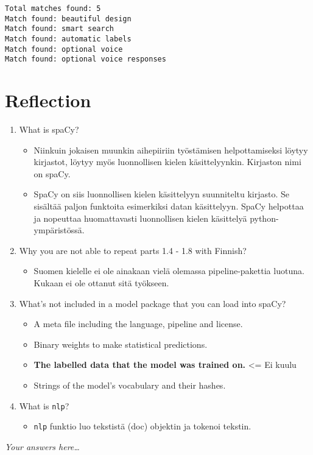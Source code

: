 \documentclass[11pt]{article}
\providecommand{\tightlist}{%
      \setlength{\itemsep}{0pt}\setlength{\parskip}{0pt}}
\begin{document}
    \begin{Verbatim}[commandchars=\\\{\}]
Total matches found: 5
Match found: beautiful design
Match found: smart search
Match found: automatic labels
Match found: optional voice
Match found: optional voice responses

    \end{Verbatim}

    \hypertarget{reflection}{%
\section{Reflection}\label{reflection}}

\begin{enumerate}
\def\labelenumi{\arabic{enumi}.}
\tightlist
\item
  What is spaCy?

  \begin{itemize}
  \tightlist
  \item
    Niinkuin jokaisen muunkin aihepiiriin työstämisen helpottamiseksi
    löytyy kirjastot, löytyy myös luonnollisen kielen käsittelyynkin.
    Kirjaston nimi on spaCy.
  \item
    SpaCy on siis luonnollisen kielen käsittelyyn suunniteltu kirjasto.
    Se sisältää paljon funktoita esimerkiksi datan käsittelyyn. SpaCy
    helpottaa ja nopeuttaa huomattavasti luonnollisen kielen käsittelyä
    python-ympäristössä.
  \end{itemize}
\item
  Why you are not able to repeat parts 1.4 - 1.8 with Finnish?

  \begin{itemize}
  \tightlist
  \item
    Suomen kielelle ei ole ainakaan vielä olemassa pipeline-pakettia
    luotuna. Kukaan ei ole ottanut sitä työkseen.
  \end{itemize}
\item
  What's not included in a model package that you can load into spaCy?

  \begin{itemize}
  \tightlist
  \item
    A meta file including the language, pipeline and license.
  \item
    Binary weights to make statistical predictions.
  \item
    \textbf{The labelled data that the model was trained on.}
    \textless{}= Ei kuulu
  \item
    Strings of the model's vocabulary and their hashes.
  \end{itemize}
\item
  What is \texttt{nlp}?

  \begin{itemize}
  \tightlist
  \item
    \texttt{nlp} funktio luo tekstistä (doc) objektin ja tokenoi
    tekstin.
  \end{itemize}
\end{enumerate}

    \emph{Your answers here\ldots{}}


    
    
    
    
\end{document}
